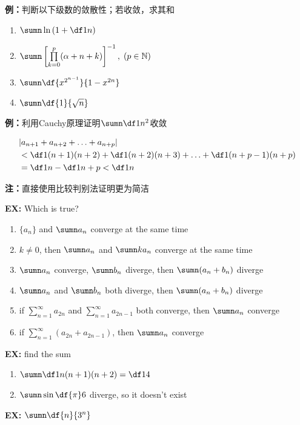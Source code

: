 {\bf 例：}判断以下级数的敛散性；若收敛，求其和

\begin{enumerate}[(1)]
  \setlength{\itemindent}{1cm}
  \item $\sumn\ln\left(1+\df 1n\right)$
  \item
  $\sumn\left[\prod\limits_{k=0}^p(\alpha+n+k)\right]^{-1},\;(p\in\mathbb{N})$
  \item $\sumn\df{x^{2^{n-1}}}{1-x^{2n}}$
  \item $\sumn\df{1}{\sqrt n}$
\end{enumerate}

{\bf 例：}利用Cauchy原理证明$\sumn\df1{n^2}$收敛

\begin{align}
	&|a_{n+1}+a_{n+2}+\ldots+a_{n+p}|\notag\\
	&<\df1{(n+1)(n+2)}+\df1{(n+2)(n+3)}+\ldots+\df1{(n+p-1)(n+p)}\notag\\
	&=\df1n-\df1{n+p}<\df1n\notag
\end{align}

{\bf 注：}直接使用比较判别法证明更为简洁

{\bf EX:} Which is true?
\begin{enumerate}[(1)]
  \setlength{\itemindent}{1cm}
  \item $\{a_n\}$ and $\sumn a_n$ converge at the same time
  \item $k\ne 0$, then $\sumn a_n$ and $\sumn ka_n$ converge at
  the same time
  \item $\sumn a_n$ converge, $\sumn b_n$ diverge, then
  $\sumn(a_n+b_n)$ diverge
  \item $\sumn a_n$ and $\sumn b_n$ both diverge, then 
  $\sumn(a_n+b_n)$ diverge
  \item if $\sum\limits_{n=1}^{\infty}a_{2n}$ and
  $\sum\limits_{n=1}^{\infty}a_{2n-1}$ both converge, then
  $\sumn a_n$ converge
  \item if $\sum\limits_{n=1}^{\infty}(a_{2n}+a_{2n-1})$, then
  $\sumn a_n$ converge
\end{enumerate}

{\bf EX:} find the sum
\begin{enumerate}[(1)]
  \setlength{\itemindent}{1cm}
  \item $\sumn\df1{n(n+1)(n+2)}=\df14$
  \item $\sumn\sin\df{\pi}6$ diverge, so it doesn't exist
\end{enumerate}

{\bf EX:} $\sumn\df{n}{3^n}$

